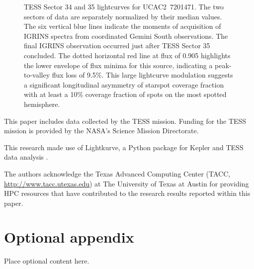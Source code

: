 \documentclass[modern]{aastex631}
\begin{document}
\begin{figure}[htb]
  \caption{\label{TESS_UCAC2} TESS Sector 34 and 35 lightcurves for UCAC2~7201471.  The two sectors of data are separately normalized by their median values.  The six vertical blue lines indicate the moments of acquisition of IGRINS spectra from coordinated Gemini South observations.  The final IGRINS observation occurred just after TESS Sector 35 concluded. The dotted horizontal red line at flux of 0.905 highlights the lower envelope of flux minima for this source, indicating a peak-to-valley flux loss of 9.5\%.  This large lightcurve modulation suggests a significant longitudinal asymmetry of starspot coverage fraction with at least a 10\% coverage fraction of spots on the most spotted hemisphere.}
\end{figure}

\begin{acknowledgements}
  This paper includes data collected by the TESS mission. Funding for the TESS mission is provided by the NASA's Science Mission Directorate.

  This research made use of Lightkurve, a Python package for Kepler and TESS data analysis \citep{2018ascl.soft12013L}.

  The authors acknowledge the Texas Advanced Computing Center (TACC, \url{http://www.tacc.utexas.edu}) at The University of Texas at Austin for providing HPC resources that have contributed to the research results reported within this paper.
\end{acknowledgements}

\clearpage








\clearpage

\appendix
\restartappendixnumbering

\section{Optional appendix} \label{appendix:tools}

Place optional content here.
\end{document}
